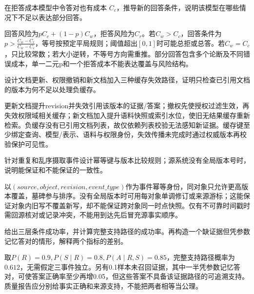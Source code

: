 \begin{exercises}
\begin{exercise}\optional 在拒答成本模型中令答对也有成本 $C_c$，推导新的回答条件，说明该模型在哪些情况下不足以表达部分回答。

\begin{solution}
回答风险为$pC_c+(1-p)C_w$，拒答风险为$C_r$。若$C_w>C_c$，回答条件为 $p>\frac{C_w-C_r}{C_w-C_c}$，等号按预定平局规则；阈值超出$[0,1]$时可能总拒或总答。若$C_w=C_c$，只比较常数；若大小逆转，不等号方向需重推。部分回答包含多个论断及不同错误成本，单一二元p和一个拒答成本不能表达覆盖与风险结构。
\end{solution}
\end{exercise}

\begin{exercise} 设计文档更新、权限撤销和新文档加入三种缓存失效路径，证明只检查已引用文档的版本为何不足以处理负缓存。

\begin{solution}
更新文档提升revision并失效引用该版本的证据/答案；撤权先使授权过滤生效，再失效权限域相关缓存；新文档加入提升语料快照或索引水位，使旧无结果缓存重新检索。负缓存没有已引用文档列表，故仅依赖列表校验无法感知新证据。缓存键至少绑定查询、模型/表示、语料与权限身份，失效传播未完成时通过权威版本再校验保护可见性。
\end{solution}
\end{exercise}

\begin{exercise} 针对重复和乱序摄取事件设计幂等键与版本比较规则；源系统没有全局版本号时，说明能保证和不能保证的一致性。

\begin{solution}
以$(source,object,revision,event\_type)$作为事件幂等身份，同对象只允许更高版本覆盖，墓碑参与排序。没有全局版本时可用每对象单调修订或来源游标；这能保证对象内旧写不覆盖新写，却不能保证跨对象同一时点快照。仅有不可靠时间戳时需回源核对或记录冲突，不能用到达先后冒充源事实顺序。
\end{solution}
\end{exercise}

\begin{exercise} 给出三层条件成功率，并计算完整支持路径的成功率。再构造一个缺证据但凭参数记忆答对的情形，解释两个指标的差别。

\begin{solution}
取$P(R)=0.9,P(S\mid R)=0.8,P(A\mid R,S)=0.85$，完整支持路径概率为$0.612$，无需假定三事件独立。另有0.1样本未召回证据，其中一半凭参数记忆答对，可使答案正确率至少再增0.05，但这些答案不具备该证据路径的可追溯支持。质量报告应分别给事实正确和来源支持，不能把两者相等当公理。
\end{solution}
\end{exercise}


\end{exercises}
